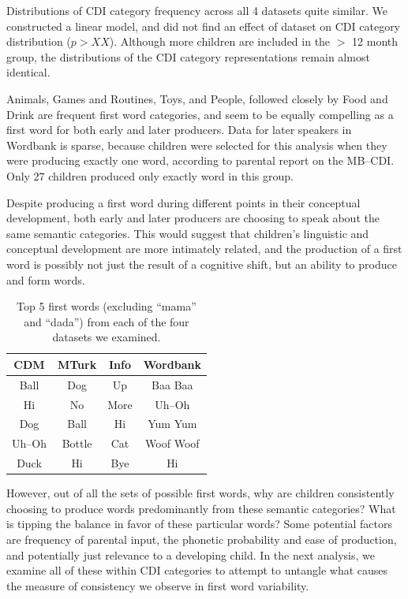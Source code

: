 \documentclass[10pt,letterpaper]{article}
\begin{document}
Distributions of CDI category frequency across all 4 datasets quite similar. We constructed a linear model, and did not find an effect of dataset on CDI category distribution ($p > XX$). Although more children are included in the $>$ 12 month group, the distributions of the CDI category representations remain almost identical.

Animals, Games and Routines, Toys, and People, followed closely by Food and Drink are frequent first word categories, and seem to be equally compelling as a first word for both early and later producers. Data for later speakers in Wordbank is sparse, because children were selected for this analysis when they were producing exactly one word, according to parental report on the MB--CDI. Only 27 children produced only exactly word in this group.

Despite producing a first word during different points in their conceptual development, both early and later producers are choosing to speak about the same semantic categories. This would suggest that children's linguistic and conceptual development are more intimately related, and the production of a first word is possibly not just the result of a cognitive shift, but an ability to produce and form words.



\begin{table}[t]
\centering
\begin{tabular}{cccc}
 \hline
    {\bf CDM} & {\bf MTurk} & {\bf Info} & {\bf Wordbank} \\ 
\hline
    Ball & Dog & Up  & Baa Baa \\ 
    Hi & No & More & Uh--Oh \\
    Dog & Ball & Hi & Yum Yum \\ 
    Uh--Oh & Bottle & Cat & Woof Woof  \\ 
    Duck & Hi & Bye & Hi \\ 
\hline		
 \end{tabular}
\caption{\label{tab:top5} Top 5 first words (excluding ``mama'' and ``dada'') from each of the four datasets we examined.}
\end{table}

However, out of all the sets of possible first words, why are children consistently choosing to produce words predominantly from these semantic categories? What is tipping the balance in favor of these particular words? Some potential factors are frequency of parental input, the phonetic probability and ease of production, and potentially just relevance to a developing child. In the next analysis, we examine all of these within CDI categories to attempt to untangle what causes the measure of consistency we observe in first word variability.
\end{document}
